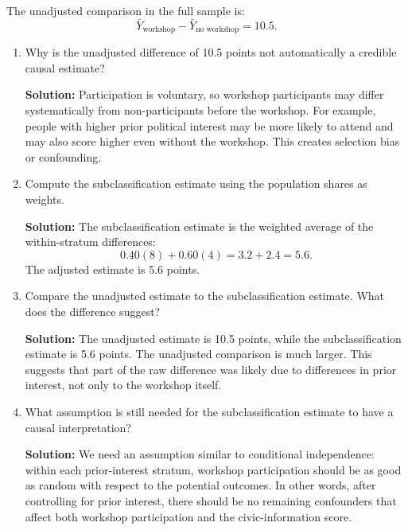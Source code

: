 \documentclass[11pt]{exam}
\begin{document}
\begin{questions}
The unadjusted comparison in the full sample is:
\[
\bar Y_{\text{workshop}}-\bar Y_{\text{no workshop}}=10.5.
\]

\begin{enumerate}[leftmargin = 0.5cm, label = (\alph*), rightmargin = 0.2cm]
    \item Why is the unadjusted difference of 10.5 points not automatically a credible causal estimate?

    \begin{solutionorbox}[5.8cm]
    \textbf{Solution:} Participation is voluntary, so workshop participants may differ systematically from non-participants before the workshop. For example, people with higher prior political interest may be more likely to attend and may also score higher even without the workshop. This creates selection bias or confounding.
    \end{solutionorbox}

    \item Compute the subclassification estimate using the population shares as weights.

    \begin{solutionorbox}[5.8cm]
    \textbf{Solution:} The subclassification estimate is the weighted average of the within-stratum differences:
    \[
    0.40(8)+0.60(4)=3.2+2.4=5.6.
    \]
    The adjusted estimate is 5.6 points.
    \end{solutionorbox}

    \item Compare the unadjusted estimate to the subclassification estimate. What does the difference suggest?

    \begin{solutionorbox}[5.8cm]
    \textbf{Solution:} The unadjusted estimate is 10.5 points, while the subclassification estimate is 5.6 points. The unadjusted comparison is much larger. This suggests that part of the raw difference was likely due to differences in prior interest, not only to the workshop itself.
    \end{solutionorbox}

    \item What assumption is still needed for the subclassification estimate to have a causal interpretation?

    \begin{solutionorbox}[6.3cm]
    \textbf{Solution:} We need an assumption similar to conditional independence: within each prior-interest stratum, workshop participation should be as good as random with respect to the potential outcomes. In other words, after controlling for prior interest, there should be no remaining confounders that affect both workshop participation and the civic-information score.
    \end{solutionorbox}
\end{enumerate}


\end{questions}
\end{document}
